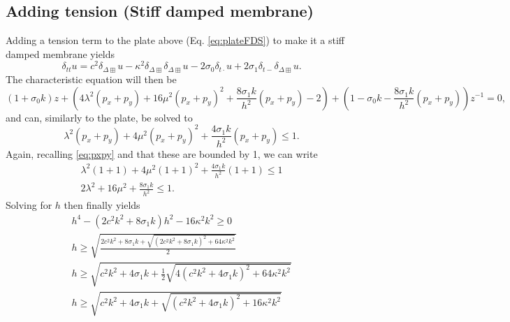 \documentclass{article}
\begin{document}
\subsection{Adding tension (Stiff damped membrane)}
Adding a tension term to the plate above (Eq. \eqref{eq:plateFDS}) to make it a stiff damped membrane yields
\begin{equation}
    \delta_{tt}u = c^2\delta_{\Delta\boxplus}u -\kappa^2\delta_{\Delta\boxplus}\delta_{\Delta\boxplus} u - 2\sigma_0\delta_{t\cdot}u + 2\sigma_1\delta_{t-}\delta_{\Delta\boxplus}u.
\end{equation}
%
The characteristic equation will then be
\begin{equation}
    (1+\sigma_0k)z + \left(4\lambda^2(p_x+p_y)+16\mu^2(p_x+p_y)^2 + \frac{8\sigma_1k}{h^2}(p_x+p_y) - 2\right) + \left(1 - \sigma_0k - \frac{8\sigma_1k}{h^2}(p_x+p_y)\right)z^{-1} = 0,
\end{equation}
and can, similarly to the plate, be solved to
\begin{equation}
    \lambda^2(p_x+p_y)+4\mu^2(p_x+p_y)^2+\frac{4\sigma_1k}{h^2}(p_x+p_y)\leq 1.
\end{equation}
Again, recalling \eqref{eq:pxpy} and that these are bounded by 1, we can write
\begin{gather}
    \lambda^2(1+1)+4\mu^2(1+1)^2+\frac{4\sigma_1k}{h^2}(1+1)\leq 1\nonumber\\
    2\lambda^2+16\mu^2+\frac{8\sigma_1k}{h^2}\leq 1.
\end{gather}
Solving for $h$ then finally yields
\begin{align}
    h^4 - (2c^2k^2 + 8\sigma_1k)h^2 - 16\kappa^2k^2 \geq 0\nonumber\\
    h\geq \sqrt{\frac{2c^2k^2 + 8\sigma_1k+\sqrt{(2c^2k^2 + 8\sigma_1k)^2 + 64\kappa^2k^2}}{2}}\nonumber \\
    h\geq \sqrt{c^2k^2 + 4\sigma_1k+\frac{1}{2}\sqrt{4(c^2k^2 + 4\sigma_1k)^2 + 64\kappa^2k^2}}\nonumber\\
    h\geq \sqrt{c^2k^2 + 4\sigma_1k+\sqrt{(c^2k^2 + 4\sigma_1k)^2 + 16\kappa^2k^2}}
\end{align}


\appendix
\newpage
\end{document}
